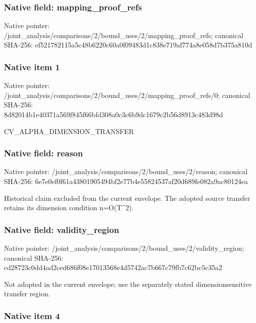 \documentclass[10pt,a4paper]{article}
\begin{document}
\subsubsection{Native field: mapping\_proof\_refs}


Native pointer: /joint\_analysis/comparis\allowbreak{}ons/2/bound\_uses/2/mappi\allowbreak{}ng\_proof\_refs; canonical SHA-256: ef521782115a5c48b6220c60\allowbreak{}a0f09483d1c838e719af774a\allowbreak{}8e058d7b375a810d



\subsubsection{Native item 1}


Native pointer: /joint\_analysis/comparis\allowbreak{}ons/2/bound\_uses/2/mappi\allowbreak{}ng\_proof\_refs/0; canonical SHA-256: 8d82014b1e40371a569f845f\allowbreak{}66bfd308a0c3c6b9dc1679c2\allowbreak{}b56d8913c483d98d


CV\_ALPHA\_DIMENSION\_TRANSFER


\subsubsection{Native field: reason}


Native pointer: /joint\_analysis/comparis\allowbreak{}ons/2/bound\_uses/2/reaso\allowbreak{}n; canonical SHA-256: 6e7e0ef0f61a43801905494b\allowbreak{}f2e77b4e55824537af20d689\allowbreak{}fe082a9ac80124ea


Historical claim excluded from the current envelope. The adopted source transfer retains its dimension condition n=O(T\textasciicircum{}2).


\subsubsection{Native field: validity\_region}


Native pointer: /joint\_analysis/comparis\allowbreak{}ons/2/bound\_uses/2/valid\allowbreak{}ity\_region; canonical SHA-256: cd28723c0dd4ad2ced686f08\allowbreak{}e17013568e4d5742ac7b667c\allowbreak{}79fb7c62bc5c35a2


Not adopted in the current envelope; use the separately stated dimensionsensitive transfer region.


\subsubsection{Native item 4}
\end{document}
